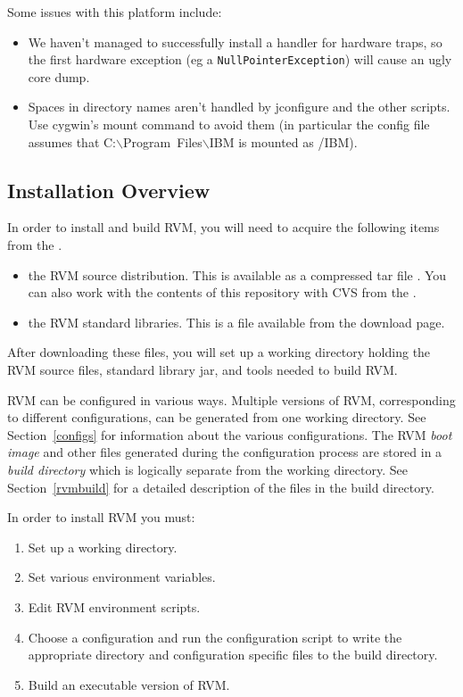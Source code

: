 Some issues with this platform include:

\begin{itemize}
\item We haven't managed to successfully install a handler for hardware traps,
so the first hardware exception (eg a {\tt NullPointerException}) will cause
an ugly core dump.
\item Spaces in directory names aren't handled by jconfigure and the
other scripts.  Use cygwin's mount command to avoid them (in
particular the config file assumes that
C:$\backslash$Program~Files$\backslash$IBM is mounted as /IBM).
\end{itemize}


\subsection{Installation Overview}

In order to install and build RVM, you will need to acquire the following
items from the 
.
\begin{itemize}
\item the RVM source distribution.  This is available as a compressed tar
file {\tt \RVMTarFile}.  You can also work with the contents of this repository with CVS from the
.
\item the RVM standard libraries.  This is a file {\tt \LibTarFile}
available from the download page. 
\end{itemize}

After downloading these files, you will set up 
a working directory holding the RVM source files, standard library jar, and 
tools needed to build RVM. 

RVM can be configured in various ways. Multiple versions of RVM,
corresponding to different configurations, can be generated from 
one working directory. See Section~\ref{configs} for information about the 
various 
configurations.
The RVM  {\em boot image} and other files generated during the 
configuration process
are stored in a {\em build directory} which is logically separate from 
the working directory. See Section~\ref{rvmbuild} for a detailed description 
of the files in the build directory.

In order to install RVM  you must:
\begin{enumerate}
\item Set up a working directory.
\item Set various environment variables.
\item Edit RVM environment scripts.
\item Choose a configuration and run the configuration script to write
the appropriate directory and configuration specific files to the
build directory.
\item Build an executable version of RVM.
\end{enumerate}

